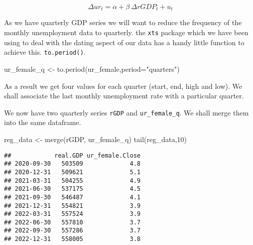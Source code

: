 \documentclass[
]{article}
\newenvironment{Shaded}{\begin{snugshade}}{\end{snugshade}}
\newcommand{\AttributeTok}[1]{\textcolor[rgb]{0.77,0.63,0.00}{#1}}
\newcommand{\DecValTok}[1]{\textcolor[rgb]{0.00,0.00,0.81}{#1}}
\newcommand{\FunctionTok}[1]{\textcolor[rgb]{0.00,0.00,0.00}{#1}}
\newcommand{\NormalTok}[1]{#1}
\newcommand{\OtherTok}[1]{\textcolor[rgb]{0.56,0.35,0.01}{#1}}
\newcommand{\SpecialCharTok}[1]{\textcolor[rgb]{0.00,0.00,0.00}{#1}}
\newcommand{\StringTok}[1]{\textcolor[rgb]{0.31,0.60,0.02}{#1}}
\begin{document}
\[\Delta ur_t = \alpha + \beta ~ \Delta  rGDP_t + u_t\]

As we have quarterly GDP series we will want to reduce the frequency of
the monthly unemployment data to quarterly. the \texttt{xts} package
which we have been using to deal with the dating aspect of our data has
a handy little function to achieve this. \texttt{to.period()}.

\begin{Shaded}
\begin{Highlighting}[]
\NormalTok{ur\_female\_q }\OtherTok{\textless{}{-}} \FunctionTok{to.period}\NormalTok{(ur\_female,}\AttributeTok{period=}\StringTok{"quarters"}\NormalTok{)}
\end{Highlighting}
\end{Shaded}

As a result we get four values for each quarter (start, end, high and
low). We shall associate the last monthly unemployment rate with a
particular quarter.

\begin{Shaded}
\end{Shaded}

We now have two quarterly series \texttt{rGDP} and
\texttt{ur\_female\_q}. We shall merge them into the same dataframe.

\begin{Shaded}
\begin{Highlighting}[]
\NormalTok{reg\_data }\OtherTok{\textless{}{-}} \FunctionTok{merge}\NormalTok{(rGDP, ur\_female\_q)}
\FunctionTok{tail}\NormalTok{(reg\_data,}\DecValTok{10}\NormalTok{)}
\end{Highlighting}
\end{Shaded}

\begin{verbatim}
##            real.GDP ur_female.Close
## 2020-09-30   503509             4.8
## 2020-12-31   509621             5.1
## 2021-03-31   504255             4.9
## 2021-06-30   537175             4.5
## 2021-09-30   546487             4.1
## 2021-12-31   554821             3.9
## 2022-03-31   557524             3.9
## 2022-06-30   557810             3.7
## 2022-09-30   557286             3.7
## 2022-12-31   558005             3.8
\end{verbatim}
\end{document}
